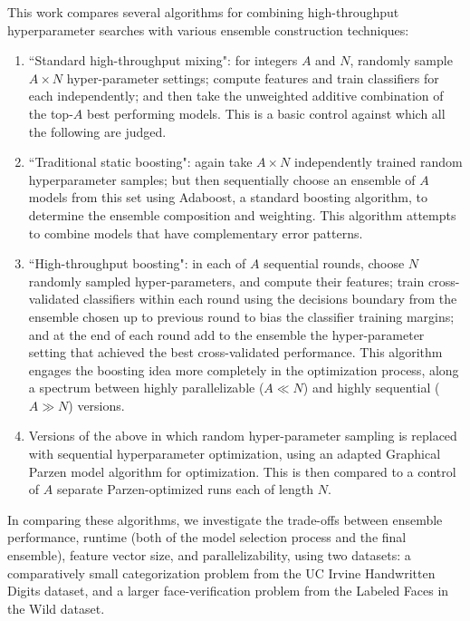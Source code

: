 \documentclass[11pt,twocolumn]{article}
\begin{document}
This work compares several algorithms for combining high-throughput hyperparameter searches with various ensemble construction techniques: 
\begin{enumerate}
\item ``Standard high-throughput mixing":  for integers $A$ and $N$, randomly sample $A \times N$ hyper-parameter settings; compute features and train classifiers for each independently; and then take the unweighted additive combination of the top-$A$ best performing models.  This is a basic control against which all the following are judged. 
\item ``Traditional static boosting":  again take $A \times N$ independently trained random hyperparameter samples; but then sequentially choose an ensemble of $A$ models from this set using Adaboost, a standard boosting algorithm, to determine the ensemble composition and weighting.   This algorithm attempts to combine models that have complementary error patterns.  
\item ``High-throughput boosting":  in each of $A$ sequential rounds, choose $N$ randomly sampled hyper-parameters, and compute their features; train cross-validated classifiers within each round using the decisions boundary from the ensemble chosen up to previous round to bias the classifier training margins; and at the end of each round add to the ensemble the hyper-parameter setting that achieved the best cross-validated performance.   This algorithm engages the boosting idea more completely in the optimization process, along a spectrum between highly parallelizable ($A \ll N$) and highly sequential ($A \gg N$) versions.
\item Versions of the above in which random hyper-parameter sampling is replaced with sequential hyperparameter optimization, using an adapted Graphical Parzen model algorithm for optimization.   This is then compared to a control of $A$ separate Parzen-optimized runs each of length $N$.
\end{enumerate}

In comparing these algorithms, we investigate the trade-offs between ensemble performance, runtime (both of the model selection process and the final ensemble), feature vector size, and parallelizability, using two datasets:  a comparatively small categorization problem from the UC Irvine Handwritten Digits dataset, and a larger face-verification problem from the Labeled Faces in the Wild dataset. 
\end{document}
